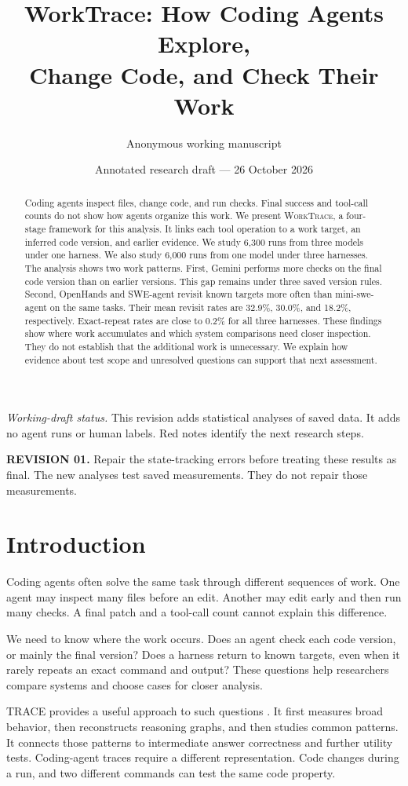 \documentclass[10pt,a4paper,twocolumn]{article}
\title{\textbf{WorkTrace: How Coding Agents Explore,\\Change Code, and Check Their Work}}
\author{Anonymous working manuscript}
\date{Annotated research draft --- 26 October 2026}
\newcommand{\rev}[2]{\par\smallskip\noindent\begin{minipage}{\linewidth}\color{revision}\footnotesize\textbf{REVISION #1.} #2\end{minipage}\par\smallskip}
\newcommand{\wt}{\textsc{WorkTrace}}
\begin{document}
\maketitle
\begin{abstract}
Coding agents inspect files, change code, and run checks. Final success and tool-call counts do not show how agents organize this work. We present \wt, a four-stage framework for this analysis. It links each tool operation to a work target, an inferred code version, and earlier evidence. We study 6,300 runs from three models under one harness. We also study 6,000 runs from one model under three harnesses. The analysis shows two work patterns. First, Gemini performs more checks on the final code version than on earlier versions. This gap remains under three saved version rules. Second, OpenHands and SWE-agent revisit known targets more often than mini-swe-agent on the same tasks. Their mean revisit rates are 32.9\%, 30.0\%, and 18.2\%, respectively. Exact-repeat rates are close to 0.2\% for all three harnesses. These findings show where work accumulates and which system comparisons need closer inspection. They do not establish that the additional work is unnecessary. We explain how evidence about test scope and unresolved questions can support that next assessment.
\end{abstract}\par\medskip
\noindent\textit{Working-draft status.} This revision adds statistical analyses of saved data. It adds no agent runs or human labels. Red notes identify the next research steps.
\rev{01}{Repair the state-tracking errors before treating these results as final. The new analyses test saved measurements. They do not repair those measurements.}

\section{Introduction}
Coding agents often solve the same task through different sequences of work. One agent may inspect many files before an edit. Another may edit early and then run many checks. A final patch and a tool-call count cannot explain this difference.

We need to know where the work occurs. Does an agent check each code version, or mainly the final version? Does a harness return to known targets, even when it rarely repeats an exact command and output? These questions help researchers compare systems and choose cases for closer analysis.

TRACE provides a useful approach to such questions \citep{trace}. It first measures broad behavior, then reconstructs reasoning graphs, and then studies common patterns. It connects those patterns to intermediate answer correctness and further utility tests. Coding-agent traces require a different representation. Code changes during a run, and two different commands can test the same code property.
\end{document}
